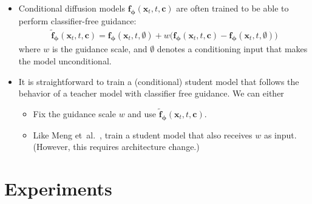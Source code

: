 \documentclass[10pt]{article}
\newcommand{\ve}[1]{\mathbf{#1}}
\newcommand{\ves}[1]{\boldsymbol{#1}}
\newcommand{\etal}{{et~al.}}
\begin{document}
\begin{itemize}
  \item Conditional diffusion models $\ve{f}_{\ves{\phi}}(\ve{x}_t, t, \ve{c})$ are often trained to be able to perform classifier-free guidance:
  \begin{align*}
    \tilde{\ve{f}}_{\ves{\phi}}(\ve{x}_t, t, \ve{c}) = \ve{f}_{\ves{\phi}}(\ve{x}_t, t, \emptyset) + w\big( \ve{f}_{\ves{\phi}}(\ve{x}_t, t, \ve{c}) - \ve{f}_{\ves{\phi}}(\ve{x}_t, t, \emptyset) \big)
  \end{align*}
  where $w$ is the guidance scale, and $\emptyset$ denotes a conditioning input that makes the model unconditional.

  \item It is straightforward to train a (conditional) student model that follows the behavior of a teacher model with classifier free guidance. We can either
  \begin{itemize}
    \item Fix the guidance scale $w$ and use $\tilde{\ve{f}}_{\ves{\phi}}(\ve{x}_t, t, \ve{c})$.
    \item Like Meng \etal~\cite{Meng:2023}, train a student model that also receives $w$ as input. (However, this requires architecture change.)
  \end{itemize}  
\end{itemize}

\section{Experiments}
\end{document}
